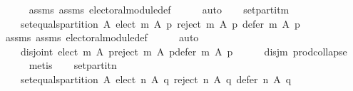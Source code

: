 \begin{isabellebody}
\ \ \ \ \isamarkupfalse%
\ assms{\isacharparenleft}{\kern0pt}{}{\isacharparenright}{\kern0pt}\ assms{\isacharparenleft}{\kern0pt}{}{\isacharparenright}{\kern0pt}\ electoral{\isacharunderscore}{\kern0pt}module{\isacharunderscore}{\kern0pt}def\isanewline
\ \ \ \ \isamarkupfalse%
\ auto\isanewline
\ \ \isamarkupfalse%
\ set{\isacharunderscore}{\kern0pt}partit{\isacharunderscore}{\kern0pt}m{\isacharcolon}{\kern0pt}\isanewline
\ \ \ \ {\isachardoublequoteopen}set{\isacharunderscore}{\kern0pt}equals{\isacharunderscore}{\kern0pt}partition\ A\ {\isacharparenleft}{\kern0pt}{\isacharparenleft}{\kern0pt}elect\ m\ A\ p{\isacharparenright}{\kern0pt}{\isacharcomma}{\kern0pt}\ {\isacharparenleft}{\kern0pt}reject\ m\ A\ p{\isacharparenright}{\kern0pt}{\isacharcomma}{\kern0pt}\ {\isacharparenleft}{\kern0pt}defer\ m\ A\ p{\isacharparenright}{\kern0pt}{\isacharparenright}{\kern0pt}{\isachardoublequoteclose}\isanewline
\ \ \ \ \isamarkupfalse%
\ assms{\isacharparenleft}{\kern0pt}{}{\isacharparenright}{\kern0pt}\ assms{\isacharparenleft}{\kern0pt}{}{\isacharparenright}{\kern0pt}\ electoral{\isacharunderscore}{\kern0pt}module{\isacharunderscore}{\kern0pt}def\isanewline
\ \ \ \ \isamarkupfalse%
\ auto\isanewline
\ \ \isamarkupfalse%
\ \isamarkupfalse%
\isanewline
\ \ \ \ {\isachardoublequoteopen}disjoint{}\ {\isacharparenleft}{\kern0pt}{\isacharparenleft}{\kern0pt}elect\ m\ A\ p{\isacharparenright}{\kern0pt}{\isacharcomma}{\kern0pt}{\isacharparenleft}{\kern0pt}reject\ m\ A\ p{\isacharparenright}{\kern0pt}{\isacharcomma}{\kern0pt}{\isacharparenleft}{\kern0pt}defer\ m\ A\ p{\isacharparenright}{\kern0pt}{\isacharparenright}{\kern0pt}{\isachardoublequoteclose}\isanewline
\ \ \ \ \isamarkupfalse%
\ disj{\isacharunderscore}{\kern0pt}m\ prod{\isachardot}{\kern0pt}collapse\isanewline
\ \ \ \ \isamarkupfalse%
\ metis\isanewline
\ \ \isamarkupfalse%
\ set{\isacharunderscore}{\kern0pt}partit{\isacharunderscore}{\kern0pt}n{\isacharcolon}{\kern0pt}\isanewline
\ \ \ \ {\isachardoublequoteopen}set{\isacharunderscore}{\kern0pt}equals{\isacharunderscore}{\kern0pt}partition\ A\ {\isacharparenleft}{\kern0pt}{\isacharparenleft}{\kern0pt}elect\ n\ A\ q{\isacharparenright}{\kern0pt}{\isacharcomma}{\kern0pt}\ {\isacharparenleft}{\kern0pt}reject\ n\ A\ q{\isacharparenright}{\kern0pt}{\isacharcomma}{\kern0pt}\ {\isacharparenleft}{\kern0pt}defer\ n\ A\ q{\isacharparenright}{\kern0pt}{\isacharparenright}{\kern0pt}{\isachardoublequoteclose}\isanewline

\end{isabellebody}
